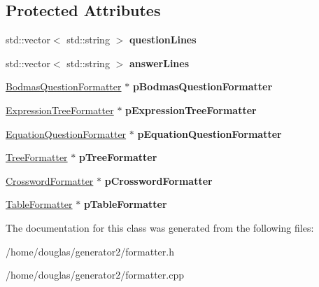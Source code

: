 \subsection*{Protected Attributes}
\begin{DoxyCompactItemize}
\item 
std\+::vector$<$ std\+::string $>$ {\bfseries question\+Lines}\hypertarget{classFormatter_abe848f063503f3587b1a83ad82df7c1e}{}\label{classFormatter_abe848f063503f3587b1a83ad82df7c1e}

\item 
std\+::vector$<$ std\+::string $>$ {\bfseries answer\+Lines}\hypertarget{classFormatter_ab2cdeb8cdcad98582233117f071d559e}{}\label{classFormatter_ab2cdeb8cdcad98582233117f071d559e}

\item 
\hyperlink{classBodmasQuestionFormatter}{Bodmas\+Question\+Formatter} $\ast$ {\bfseries p\+Bodmas\+Question\+Formatter}\hypertarget{classFormatter_a310eae52988f88652fc6f5dbf663e6d4}{}\label{classFormatter_a310eae52988f88652fc6f5dbf663e6d4}

\item 
\hyperlink{classExpressionTreeFormatter}{Expression\+Tree\+Formatter} $\ast$ {\bfseries p\+Expression\+Tree\+Formatter}\hypertarget{classFormatter_a31bd119c1109ccfdec1024775414094e}{}\label{classFormatter_a31bd119c1109ccfdec1024775414094e}

\item 
\hyperlink{classEquationQuestionFormatter}{Equation\+Question\+Formatter} $\ast$ {\bfseries p\+Equation\+Question\+Formatter}\hypertarget{classFormatter_a1d44637895cb280cc04e12cfebeb2b0a}{}\label{classFormatter_a1d44637895cb280cc04e12cfebeb2b0a}

\item 
\hyperlink{classTreeFormatter}{Tree\+Formatter} $\ast$ {\bfseries p\+Tree\+Formatter}\hypertarget{classFormatter_a7a0449140b074f4918f1235657eca242}{}\label{classFormatter_a7a0449140b074f4918f1235657eca242}

\item 
\hyperlink{classCrosswordFormatter}{Crossword\+Formatter} $\ast$ {\bfseries p\+Crossword\+Formatter}\hypertarget{classFormatter_ae3237e47677e1ed9da3dea4d912b4a3c}{}\label{classFormatter_ae3237e47677e1ed9da3dea4d912b4a3c}

\item 
\hyperlink{classTableFormatter}{Table\+Formatter} $\ast$ {\bfseries p\+Table\+Formatter}\hypertarget{classFormatter_a7919aa24002409a139d7b6730630ab86}{}\label{classFormatter_a7919aa24002409a139d7b6730630ab86}

\end{DoxyCompactItemize}


The documentation for this class was generated from the following files\+:\begin{DoxyCompactItemize}
\item 
/home/douglas/generator2/formatter.\+h\item 
/home/douglas/generator2/formatter.\+cpp\end{DoxyCompactItemize}
